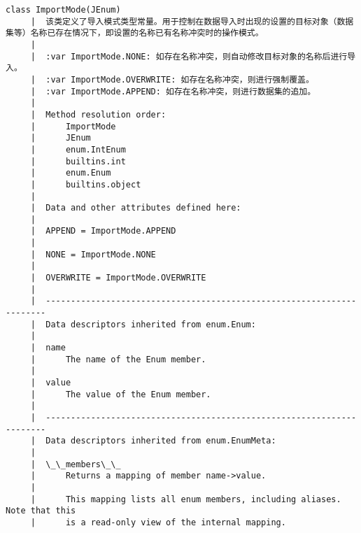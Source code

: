 \documentclass[11pt]{article}
\begin{document}
\begin{Verbatim}[commandchars=\\\{\}]
    class ImportMode(JEnum)
     |  该类定义了导入模式类型常量。用于控制在数据导入时出现的设置的目标对象（数据集等）名称已存在情况下，即设置的名称已有名称冲突时的操作模式。
     |  
     |  :var ImportMode.NONE: 如存在名称冲突，则自动修改目标对象的名称后进行导入。
     |  :var ImportMode.OVERWRITE: 如存在名称冲突，则进行强制覆盖。
     |  :var ImportMode.APPEND: 如存在名称冲突，则进行数据集的追加。
     |  
     |  Method resolution order:
     |      ImportMode
     |      JEnum
     |      enum.IntEnum
     |      builtins.int
     |      enum.Enum
     |      builtins.object
     |  
     |  Data and other attributes defined here:
     |  
     |  APPEND = ImportMode.APPEND
     |  
     |  NONE = ImportMode.NONE
     |  
     |  OVERWRITE = ImportMode.OVERWRITE
     |  
     |  ----------------------------------------------------------------------
     |  Data descriptors inherited from enum.Enum:
     |  
     |  name
     |      The name of the Enum member.
     |  
     |  value
     |      The value of the Enum member.
     |  
     |  ----------------------------------------------------------------------
     |  Data descriptors inherited from enum.EnumMeta:
     |  
     |  \_\_members\_\_
     |      Returns a mapping of member name->value.
     |      
     |      This mapping lists all enum members, including aliases. Note that this
     |      is a read-only view of the internal mapping.
    

\end{Verbatim}
\end{document}
